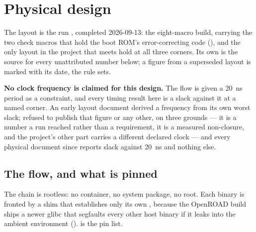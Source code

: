 
\chapter{Physical design}
\label{ch:phys}

The layout is the run , completed 2026-09-13: the
eight-macro build, carrying the two check macros that hold the boot
ROM's error-correcting code (), and the only
layout in the project that meets hold at all three corners. Its own
 is the source for every unattributed number
below; a figure from a superseded layout is marked with its date, the
rule  sets.

\textbf{No clock frequency is claimed for this design.} The flow is
given a \qty{20}{\nano\second} period as a constraint, and every timing
result here is a slack against it at a named corner. An early layout
document derived a frequency from its own worst slack;
 refused to publish that figure or any other, on
three grounds --- it is a number a run reached rather than a
requirement, it is a measured non-closure, and the project's other part
carries a different declared clock --- and every physical document since
reports slack against \qty{20}{\nano\second} and nothing else.

\section{The flow, and what is pinned}

The chain is rootless: no container, no system package, no root. Each
binary is fronted by a shim that establishes only its own
, because the OpenROAD build ships a newer glibc
that segfaults every other host binary if it leaks into the ambient
environment ().  is the pin
list.

